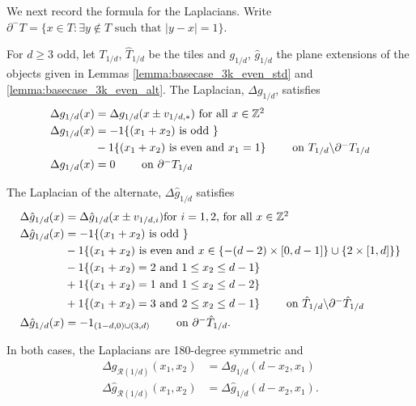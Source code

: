 \documentclass[12pt]{amsart}
\begin{document}
We next record the formula for the Laplacians.  Write  $\partial^{-} T = \{ x \in T : \exists y \not \in T \mbox{ such that } |y-x|=1\}$.
\begin{lemma} \label{lemma:staircase_laplacian}
	For $d \geq 3$ odd, let $T_{1/d}$, $\hat{T}_{1/d}$ be the tiles and $g_{1/d}$, $\hat{g}_{1/d}$ the plane extensions of the objects given in Lemmas \ref{lemma:basecase_3k_even_std}
	and \ref{lemma:basecase_3k_even_alt}. The Laplacian, $\Delta g_{1/d}$, satisfies
	\begin{equation}
	\begin{aligned}
		\Delta g_{1/d}(x)  &=  \Delta g_{1/d}(x \pm v_{1/d, *})  \mbox{ for all $x \in \mathbb{Z}^2$} \\
		\Delta g_{1/d}(x) &= -1\{ (x_1+x_2) \mbox{ is odd } \} \\
		&-1\{ (x_1+x_2) \mbox{ is even and $x_1 = 1$} \} \qquad \mbox{ on $T_{1/d} \backslash \partial^{-}T_{1/d}$} \\
		\Delta g_{1/d}(x) &= 0 \qquad \mbox{ on $\partial^{-}T_{1/d}$}
	\end{aligned}
	\end{equation}
	
	
	The Laplacian of the alternate, $\Delta \hat{g}_{1/d}$ satisfies 
	\begin{equation}
	\begin{aligned}
	\Delta \hat{g}_{1/d}(x)  &=  \Delta \hat{g}_{1/d}(x \pm v_{1/d, i})  \mbox{for $i = 1,2$, for all $x \in \mathbb{Z}^2$} \\
	\Delta \hat{g}_{1/d}(x) &= -1\{ (x_1+x_2) \mbox{ is odd } \}\\
	&  -1\{ (x_1+x_2) \mbox{ is even and $x \in \{-(d-2) \times [0,d-1]\} \cup \{2 \times [1, d] \}$} \} \\
	&  -1\{ (x_1 +x_2) = 2  \mbox{ and $1 \leq x_2 \leq d-1$} \}\\
	&+ 1 \{ (x_1 + x_2) = 1 \mbox{ and $1 \leq x_2 \leq d-2$} \} \\
	&+ 1 \{ (x_1 + x_2) = 3 \mbox{ and $2 \leq x_2 \leq d-1$} \} \qquad \mbox{ on $\hat T_{1/d} \backslash \partial^{-}\hat T_{1/d}$} \\
	\Delta \hat{g}_{1/d}(x) &= -1_{ (1-d,0) \cup (3,d)} \qquad \mbox{ on $\partial^{-}\hat T_{1/d}$}.
	\end{aligned}
	\end{equation}
	
	In both cases, the Laplacians are 180-degree symmetric and  
	\begin{align*}
	\Delta g_{\mathcal{R}(1/d)}(x_1,x_2) &= \Delta g_{1/d}(d-x_2,x_1) \\
	\Delta \hat{g}_{\mathcal{R}(1/d)}(x_1,x_2) &= \Delta \hat{g}_{1/d}(d-x_2,x_1).
	\end{align*}

	

\end{lemma}
\end{document}
